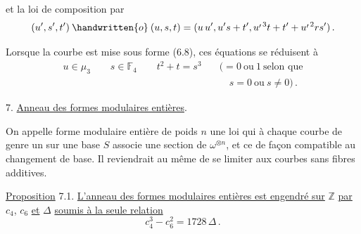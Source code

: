 %
%
et la loi de composition par
\[
(u',s',t')\mathbin{\handwritten{o}}(u,s,t)
=(u\,u',u's+t',u^{\raisebox{-.38ex}{$\scriptstyle\prime$}\,3}t+t'+u^{\raisebox{-.38ex}{$\scriptstyle\prime$}\,2}rs')\, .
\]

Lorsque la courbe est mise sous forme (6.8), ces équations se réduisent à
\[
\begin{aligned}
u\in\mu_3 \qquad s\in\mathbb{F}_4 \qquad t^2+t=s^3
 &\quad ({}=0\ \text{ou}\ 1\ \text{selon que}\\
 &\qquad s=0\ \text{ou}\ s\ne 0) \, .
\end{aligned}
\]

7. \quad \uline{Anneau des formes modulaires entières}.

On appelle forme modulaire entière de poids $n$ une loi qui à chaque courbe de genre un sur une base $S$ associe une section de $\omega^{\otimes n}$, et ce de façon compatible au changement de base. Il reviendrait au même de se limiter aux courbes sans fibres additives.

\uline{Proposition} 7.1. \quad \uline{L'anneau des formes modulaires entières est engendré sur} $\mathbb{Z}$ \uline{par} $c_4$, $c_6$ \uline{et} $\Delta$ \uline{soumis à la seule relation}
\[
c_4^3-c_6^2=1728\,\Delta \, . \tag*{(7.2.)}
\]

